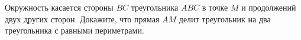 \begin{ex}
	\begin{condition}
		Окружность касается стороны \( BC  \) треугольника \( ABC  \) в точке \( M  \) и продолжений двух других сторон. Докажите, что прямая \( AM  \) делит треугольник на два треугольника с равными периметрами.
	\end{condition}
\end{ex}